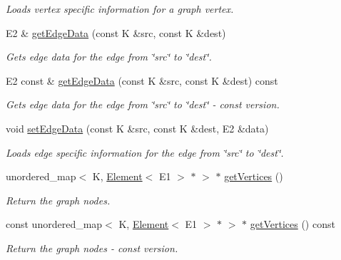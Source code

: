 \begin{DoxyCompactItemize}
\begin{DoxyCompactList}\small\item\em Loads vertex specific information for a graph vertex. \end{DoxyCompactList}\item 
E2 \& \hyperlink{classbridges_1_1datastructure_1_1_graph_adj_list_ab56ec428deb9a5bc4499f42bbd710b1a}{get\+Edge\+Data} (const K \&src, const K \&dest)
\begin{DoxyCompactList}\small\item\em Gets edge data for the edge from \char`\"{}src\char`\"{} to \char`\"{}dest\char`\"{}. \end{DoxyCompactList}\item 
E2 const  \& \hyperlink{classbridges_1_1datastructure_1_1_graph_adj_list_a5c2cdffda7c983c3141ae36acc2b698d}{get\+Edge\+Data} (const K \&src, const K \&dest) const
\begin{DoxyCompactList}\small\item\em Gets edge data for the edge from \char`\"{}src\char`\"{} to \char`\"{}dest\char`\"{} -\/ const version. \end{DoxyCompactList}\item 
void \hyperlink{classbridges_1_1datastructure_1_1_graph_adj_list_a21a7e957d60e18b540dc778b1d569372}{set\+Edge\+Data} (const K \&src, const K \&dest, E2 \&data)
\begin{DoxyCompactList}\small\item\em Loads edge specific information for the edge from \char`\"{}src\char`\"{} to \char`\"{}dest\char`\"{}. \end{DoxyCompactList}\item 
unordered\+\_\+map$<$ K, \hyperlink{classbridges_1_1datastructure_1_1_element}{Element}$<$ E1 $>$ $\ast$ $>$ $\ast$ \hyperlink{classbridges_1_1datastructure_1_1_graph_adj_list_af91334de325f4be241c3c939ea9c5a36}{get\+Vertices} ()
\begin{DoxyCompactList}\small\item\em Return the graph nodes. \end{DoxyCompactList}\item 
const unordered\+\_\+map$<$ K, \hyperlink{classbridges_1_1datastructure_1_1_element}{Element}$<$ E1 $>$ $\ast$ $>$ $\ast$ \hyperlink{classbridges_1_1datastructure_1_1_graph_adj_list_a77b21cfdb87c4cf45ce29be6e7dd9791}{get\+Vertices} () const
\begin{DoxyCompactList}\small\item\em Return the graph nodes -\/ const version. \end{DoxyCompactList}\item 

\end{DoxyCompactItemize}
